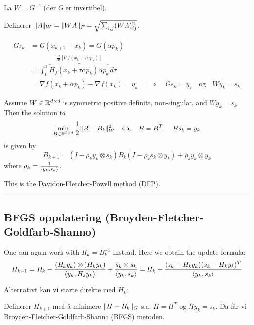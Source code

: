 La \( W = G^{-1} \) (der \( G \) er invertibel).

Definerer \( \lVert A\rVert_W = \lVert WA\rVert_F = \sqrt{\sum_{i,j} (W A)_{ij}^2} \).

\begin{remark}{}{}
  \begin{align*}
    Gs_k & = G(x_{k+1} - x_k) = G(\alpha p_k)                                                                                                                 \\
         & = \int_0^1 \overbrace{H_f(x_k + \tau \alpha p_k) \alpha p_k}^{\frac{\partial}{\partial \tau}\left[\nabla f(x_k + \tau \alpha p_k)\right]} \, d\tau \\
         & = \nabla f(x_k + \alpha p_k) - \nabla f(x_k) = y_k \quad \implies \quad Gs_k = y_k \quad \text{og} \quad W y_k = s_k
  \end{align*}
\end{remark}

\begin{theorem}{}{}
  Assume \(W\in \mathbb{R}^{d \times d}\) is symmetric positive definite, non-singular, and \(W y_k = s_k\). Then the solution to
  \[
    \min_{B \in \mathbb{R}^{d \times d}} \frac{1}{2} \lVert B - B_k\rVert_W^2 \quad \text{s.a.} \quad B = B^T, \quad B s_k = y_k
  \]
  is given by
  \[
    B_{k+1} = \left(I - \rho_k y_k \otimes s_k\right) B_k \left(I - \rho_k s_k \otimes y_k\right) + \rho_k y_k \otimes y_k
  \]
  where \( \rho_k = \frac{1}{\langle y_k, s_k\rangle} \).

  This is the Davidon-Fletcher-Powell method (DFP).
\end{theorem}

\hrule
\vspace{1em}

\subsection*{BFGS oppdatering (Broyden-Fletcher-Goldfarb-Shanno)}

One can again work with \(H_k = B_k^{-1}\) instead.
Here we obtain the update formula:
\[
  H_{k+1} = H_k - \frac{\left(H_k y_k\right) \otimes \left(H_k y_k\right)}{\langle y_k, H_k y_k\rangle} + \frac{s_k \otimes s_k}{\langle y_k, s_k\rangle}
  = H_k + \frac{(s_k - H_k y_k)(s_k - H_k y_k)^T}{\langle y_k, s_k\rangle}
\]

Alternativt kan vi starte direkte med \(H_k \):

Definerer \( H_{k+1} \) med å minimere \( \lVert H - H_k\rVert_G \) s.a. \( H = H^T \) og \( H y_k = s_k \).
Da får vi Broyden-Fletcher-Goldfarb-Shanno (BFGS) metoden.

